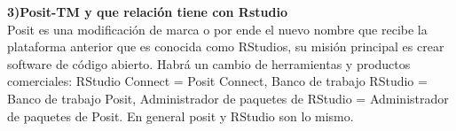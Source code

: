 \documentclass[ebook,12pt,oneside,openany]{memoir}
\begin{document}
\textbf{3)Posit-TM y que relación tiene con Rstudio}\\

Posit es una modificación de marca o por ende el nuevo nombre que recibe la plataforma anterior
que es conocida como RStudios, su misión principal es crear software de código abierto. Habrá
un cambio de herramientas y productos comerciales: RStudio Connect = Posit Connect, Banco de
trabajo RStudio = Banco de trabajo Posit, Administrador de paquetes de RStudio = Administrador
de paquetes de Posit. En general posit y RStudio son lo mismo.
\end{document}
